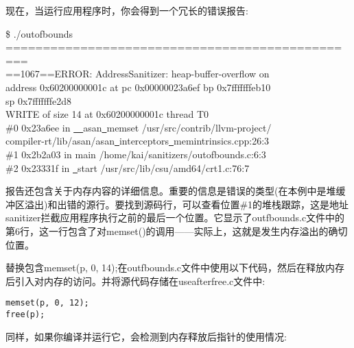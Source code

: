现在，当运行应用程序时，你会得到一个冗长的错误报告:\par

\begin{tcolorbox}[colback=white,colframe=black]
\$ ./outofbounds \\
============================================= \\
=== \\
==1067==ERROR: AddressSanitizer: heap-buffer-overflow on \\
address 0x60200000001c at pc 0x00000023a6ef bp 0x7fffffffeb10 \\
sp 0x7fffffffe2d8 \\
WRITE of size 14 at 0x60200000001c thread T0 \\
\hspace*{1cm}\#0 0x23a6ee in \underline{~~}asan\underline{~}memset /usr/src/contrib/llvm-project/ \\
compiler-rt/lib/asan/asan\underline{~}interceptors\underline{~}memintrinsics.cpp:26:3 \\
\hspace*{1cm}\#1 0x2b2a03 in main /home/kai/sanitizers/outofbounds.c:6:3 \\
\hspace*{1cm}\#2 0x23331f in \underline{~}start /usr/src/lib/csu/amd64/crt1.c:76:7
\end{tcolorbox}

报告还包含关于内存内容的详细信息。重要的信息是错误的类型(在本例中是堆缓冲区溢出)和出错的源行。要找到源码行，可以查看位置\#1的堆栈跟踪，这是地址sanitizer拦截应用程序执行之前的最后一个位置。它显示了outfbounds.c文件中的第6行，这一行包含了对memset()的调用——实际上，这就是发生内存溢出的确切位置。\par

替换包含memset(p, 0, 14);在outfbounds.c文件中使用以下代码，然后在释放内存后引入对内存的访问。并将源代码存储在useafterfree.c文件中:\par

\begin{lstlisting}[caption={}]
memset(p, 0, 12);
free(p);
\end{lstlisting}

同样，如果你编译并运行它，会检测到内存释放后指针的使用情况:\par

